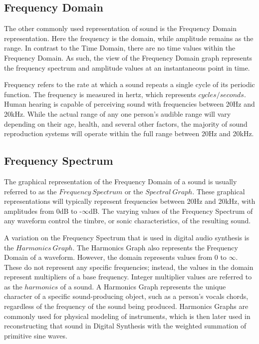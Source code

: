 \documentclass[a4paper,12pt]{report}
\begin{document}
\subsection{Frequency Domain}
The other commonly used representation of sound is the Frequency Domain representation. Here the frequency is the domain, while amplitude remains as the range. In contrast to the Time Domain, there are no time values within the Frequency Domain. As such, the view of the Frequency Domain graph represents the frequency spectrum and amplitude values at an instantaneous point in time.

Frequency refers to the rate at which a sound repeats a single cycle of its periodic function. The frequency is measured in hertz, which represents $cycles/seconds$. Human hearing is capable of perceiving sound with frequencies between 20Hz and 20kHz. While the actual range of any one person's audible range will vary depending on their age, health, and several other factors, the majority of sound reproduction systems will operate within the full range between 20Hz and 20kHz. 

\subsection{Frequency Spectrum}
The graphical representation of the Frequency Domain of a sound is usually referred to as the $Frequency\ Spectrum$ or the $Spectral\ Graph$. These graphical representations will typically represent frequencies between 20Hz and 20kHz, with amplitudes from 0dB to -$\infty$dB. The varying values of the Frequency Spectrum of any waveform control the timbre, or sonic characteristics, of the resulting sound.

A variation on the Frequency Spectrum that is used in digital audio synthesis is the $Harmonics\ Graph$. The Harmonics Graph also represents the Frequency Domain of a waveform. However, the domain represents values from 0 to $\infty$. These do not represent any specific frequencies; instead, the values in the domain represent multipliers of a base frequency. Integer multiplier values are referred to as the $harmonics$ of a sound. A Harmonics Graph represents the unique character of a specific sound-producing object, such as a person's vocals chords, regardless of the frequency of the sound being produced. Harmonics Graphs are commonly used for physical modeling of instruments, which is then later used in reconstructing that sound in Digital Synthesis with the weighted summation of primitive sine waves.
\end{document}
